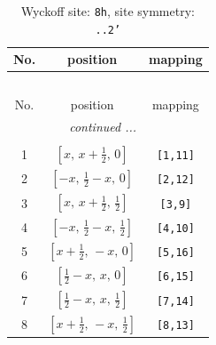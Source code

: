 \documentclass[fleqn,8pt]{jsarticle}
\begin{document}
\begin{longtable}{ccc}
\caption{Wyckoff site: {\tt 8h}, site symmetry: {\tt ..2'}}
 \\
 \hline \hline
No. & position & mapping \\ \hline \endfirsthead

\multicolumn{2}{l}{\tablename\ \thetable{}} \\
 \hline \hline
No. & position & mapping \\ \hline \endhead

 \hline \hline
\multicolumn{2}{r}{\footnotesize\it continued ...} \\ \endfoot

 \hline \hline
\multicolumn{2}{r}{} \\ \endlastfoot

1 & $\left[ x,\, x + \frac{1}{2},\, 0 \right]$ & {\tt [1,11]} \\ \hline
2 & $\left[ - x,\, \frac{1}{2} - x,\, 0 \right]$ & {\tt [2,12]} \\ \hline
3 & $\left[ x,\, x + \frac{1}{2},\, \frac{1}{2} \right]$ & {\tt [3,9]} \\ \hline
4 & $\left[ - x,\, \frac{1}{2} - x,\, \frac{1}{2} \right]$ & {\tt [4,10]} \\ \hline
5 & $\left[ x + \frac{1}{2},\, - x,\, 0 \right]$ & {\tt [5,16]} \\ \hline
6 & $\left[ \frac{1}{2} - x,\, x,\, 0 \right]$ & {\tt [6,15]} \\ \hline
7 & $\left[ \frac{1}{2} - x,\, x,\, \frac{1}{2} \right]$ & {\tt [7,14]} \\ \hline
8 & $\left[ x + \frac{1}{2},\, - x,\, \frac{1}{2} \right]$ & {\tt [8,13]} \\
\end{longtable}
\renewcommand{\arraystretch}{1.2}
\end{document}

